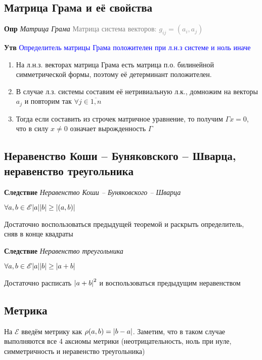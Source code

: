 \documentclass[a4paper, 14pt]{article}
\begin{document}
    \subsection{Матрица Грама и её свойства}
    
    \textbf{Опр} \textit{Матрица Грама} \textcolor{gray}{Матрица система векторов: $g_{ij} = (a_i, a_j)$}
    
    \textbf{Утв} \textcolor{blue}{Определитель матрицы Грама положителен при л.н.з системе и ноль иначе}
    
    \begin{enumerate}
        \item На л.н.з. векторах матрица Грама есть матрица п.о. билинейной симметрической формы, поэтому её
        детерминант положителен.
        \item В случае л.з. системы составим её нетривиальную л.к., домножим на векторы $a_j$ и повторим так $\forall j \in \overline{1, n}$
        \item Тогда если составить из строчек матричное уравнение, то получим $\Gamma x = 0$, что в силу $x \neq 0$
        означает вырожденность $\Gamma$
    \end{enumerate}
    
    \subsection{Неравенство Коши -- Буняковского -- Шварца, неравенство треугольника}
    
    \textbf{Следствие} \textit{Неравенство Коши -- Буняковского -- Шварца}
    
    \textcolor{blue}{$\forall a, b \in \mathscr{E} \abs{a} \abs{b} \geq \abs{(a, b)}$}
    
    Достаточно воспользоваться предыдущей теоремой и раскрыть определитель, сняв в конце квадраты
    
    \textbf{Следствие} \textit{Неравенство треугольника}
    
    \textcolor{blue}{$\forall a, b \in \mathscr{E} \abs{a} \abs{b} \geq \abs{a + b}$}
    
    Достаточно расписать $\abs{a+b}^2$ и воспользоваться предыдущим неравенством
    
    \subsection{Метрика}
    
    На $\mathscr{E}$ введём метрику как $\rho (a, b) = \abs{b - a}$.
    Заметим, что в таком случае выполняются все 4 аксиомы метрики (неотрицательность, ноль при нуле, симметричность и
    неравенство треугольника)
    
\end{document}
